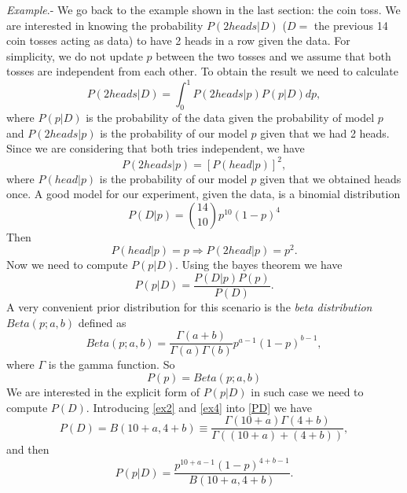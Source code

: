 \documentclass[onecolumn,           %
               showpacs,            %
               preprintnumbers,     %
               aps,                 %
               letterpaper,             %
               superscriptaddress,      %
               nofootinbib,         %
               tightenlines,        %
               floats,floatfix      %
               ,usenatbib,
               ]{revtex4-1}
\begin{document}
\textit{Example}.- We go back to the example shown in the last section: the coin toss. We are interested in knowing the probability $P(2heads|D)$ ($D=$ the previous 14 coin tosses acting as data) to have 2 heads in a row given the data. For simplicity, we do not update $p$ between the two tosses and we assume that both tosses are independent from each other. To obtain the result we need to calculate
\begin{equation}\label{ex}
P(2heads|D)=\int^1_0 P(2heads|p)P(p|D)dp,
\end{equation}
where $P(p|D)$ is the probability of the data given the probability of model $p$ and $P(2heads|p)$ is the probability of our model $p$ given that we had 2 heads. Since we are considering that both tries independent, we have
\begin{equation}
P(2heads|p)=[P(head|p)]^2 ,
\end{equation}
where $P(head|p)$ is the probability of our model $p$ given that we obtained heads once. A good model for our experiment, given the data, is a binomial distribution
\begin{equation}\label{ex2}
P(D|p)=\binom{14}{10}p^{10}(1-p)^4
\end{equation}
Then 
\begin{equation}\label{ex1}
P(head|p)=p\Rightarrow P(2head|p)=p^2.
\end{equation}
Now we need to compute $P(p|D)$. Using the bayes theorem we have
\begin{equation}
P(p|D)=\frac{P(D|p)P(p)}{P(D)}.
\end{equation}
A very convenient prior distribution for this scenario is the \textit{beta distribution} $Beta(p;a,b)$ defined as
\begin{equation}\label{ex3}
Beta(p;a,b)=\frac{\Gamma(a+b)}{\Gamma(a)\Gamma(b)}p^{a-1}(1-p)^{b-1},
\end{equation}
where $\Gamma$ is the gamma function. So
\begin{equation}\label{ex4}
P(p)=Beta(p;a,b)
\end{equation}
We are interested in the explicit form of $P(p|D)$ in such case we need to compute $P(D)$. Introducing \eqref{ex2} and \eqref{ex4} into \eqref{PD} we have
\begin{equation}
P(D)=B(10+a,4+b)\equiv \frac{\Gamma(10+a)\Gamma(4+b)}{\Gamma((10+a)+(4+b))},
\end{equation}
and then
\begin{equation}\label{ex5}
P(p|D)=\frac{p^{10+a-1}(1-p)^{4+b-1}}{B(10+a,4+b)}.
\end{equation}
\end{document}
